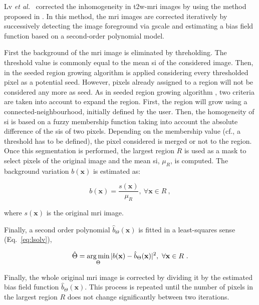 Lv \textit{et al.}~\cite{Lv2009} corrected the inhomogeneity in \ac{t2w}-\ac{mri} images by using the method proposed in \cite{Madabhushi2006}.
In this method, the \ac{mri} images are corrected iteratively by successively detecting the image foreground via \ac{gscale} and estimating a bias field function based on a second-order polynomial model. 
{\color{blue}
First the background of the \ac{mri} image is eliminated by threholding.
The threshold value is commonly equal to the mean \ac{si} of the considered image.
Then, in the seeded region growing algorithm is applied considering every thresholded pixel as a potential seed.
However, pixels already assigned to a region will not be considered any more as seed.
As in seeded region growing algorithm \cite{Shapiro2001}, two criteria are taken into account to expand the region.
First, the region will grow using a connected-neighbourhood, initially defined by the user.
Then, the homogeneity of \ac{si} is based on a fuzzy membership function taking into account the absolute difference of the \acp{si} of two pixels.
Depending on the membership value (cf., a threshold has to be defined), the pixel considered is merged or not to the region.
Once this segmentation is performed, the largest region $R$ is used as a mask to select pixels of the original image and the mean \ac{si}, $\mu_{R}$, is computed. 
The background variation $b(\mathbf{x})$ is estimated as:

\begin{equation}
	b(\mathbf{x}) = \frac{s(\mathbf{x})}{\mu_{R}}, \ \forall \mathbf{x} \in R \ ,
	\label{eq:backest}
\end{equation}

\noindent where $s(\mathbf{x})$ is the original \ac{mri} image.

Finally, a second order polynomial $\hat{b}_{\Theta}(\mathbf{x})$ is fitted in a least-squares sense (Eq.~\eqref{eq:lsolv}),

\begin{equation}
	\hat{\Theta} = \operatorname*{arg\,min}_{\Theta} | b(\mathbf{x}) - \hat{b}_{\Theta}(\mathbf{x}) |^{2}, \ \forall \mathbf{x} \in R \ .
	\label{eq:lsolv}
\end{equation}

Finally, the whole original \ac{mri} image is corrected by dividing it by the estimated bias field function $\hat{b}_{\Theta}(\mathbf{x})$.
This process is repeated until the number of pixels in the largest region $R$ does not change significantly between two iterations.
}


